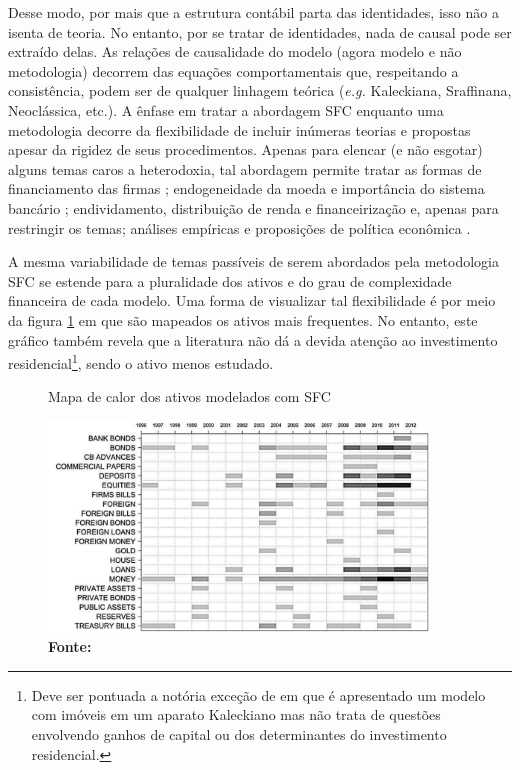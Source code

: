 Desse modo, por mais que a estrutura contábil parta das identidades, isso não a isenta de teoria. No entanto, por se tratar de identidades, nada de causal pode ser extraído delas. As relações de causalidade do modelo (agora modelo e não metodologia) decorrem das equações comportamentais que, respeitando a consistência, podem ser de qualquer linhagem teórica (\textit{e.g.} Kaleckiana, Sraffinana, Neoclássica, etc.). A ênfase em tratar a abordagem SFC enquanto uma metodologia decorre da flexibilidade de incluir inúmeras teorias e propostas apesar da rigidez de seus procedimentos. Apenas para elencar (e não esgotar) alguns temas caros a heterodoxia, tal abordagem permite tratar as formas de financiamento das firmas \cites{asimakopulos_kalecki_1983}{skott_finance_1988}{messori_financing_1991}; endogeneidade da moeda e importância do sistema bancário \cites{messori_financing_1991}{dow_horizontalism:_1996}{arestis_theoretical_1996}{godley_money_1999}{lavoie_note_1999}{lima_macrodynamics_2007}; endividamento, distribuição de renda e financeirização \cites{palley_inside_1996}{wolfson_irving_1996}{palley_money_1997}{palley_financial_2002}{dos_santos_revisiting_2009}{palley_inside_2010}{hein_finance-dominated_2012} e, apenas para restringir os temas; análises empíricas e proposições de política econômica \cites{godley_seven_1999}{godley_fiscal_2007}{godley_simple_2007}{arestis_income_2011}{zezza_design_2019}. 

A mesma variabilidade de temas passíveis de serem abordados pela metodologia SFC se estende para a pluralidade dos ativos e do grau de complexidade financeira de cada modelo. Uma forma de visualizar tal flexibilidade é por meio da figura \ref{Heatmap} em que são mapeados os ativos mais frequentes. No entanto, este gráfico também revela que a literatura não dá a devida atenção ao investimento residencial\footnote{Deve ser pontuada a notória exceção de \textcite{zezza_u.s._2008} em que é apresentado um modelo com imóveis em um aparato Kaleckiano mas não trata de questões envolvendo ganhos de capital ou dos determinantes do investimento residencial.}, sendo o ativo menos estudado. 
\begin{figure}
    \centering
    \caption{Mapa de calor dos ativos modelados com SFC}
    \label{Heatmap}
    \includegraphics[width = 0.9\textwidth]{Modelo/Caverzassi_Heatmap.png}
    \caption*{\textbf{Fonte:} \textcite[p.~4]{caverzasi_stock-flow_2013}}
\end{figure}


